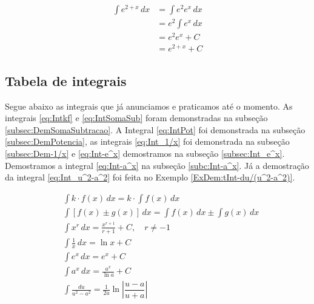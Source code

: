 \cleardoublepage\documentclass[../main.tex]{subfiles}
\begin{document}
\begin{ex}
  \begin{align*}
    \int e^{2 + x}\,dx &= \int e^2e^x\,dx \\
                       &= e^2\int e^x\,dx \\
                       &= e^2e^x + C \\
                       &= e^{2+x} + C
  \end{align*}
\end{ex}

\subsection*{Tabela de integrais}
Segue abaixo as integrais que já anunciamos e praticamos até o momento. As integrais \eqref{eq:Intkf}  e \eqref{eq:IntSomaSub} foram demonstradas na subseção \ref{subsec:DemSomaSubtracao}. A Integral \ref{eq:IntPot}  foi demonstrada na subseção \ref{subsec:DemPotencia}, as integrais \eqref{eq:Int_1/x} foi demonstrada na subseção \ref{subsec:Dem-1/x} e \eqref{eq:Int-e^x} demostramos na subseção \ref{subsec:Int_e^x}. Demostramos a integral \eqref{eq:Int-a^x}  na subseção \ref{subc:Int-a^x}. Já a demostração da integral \eqref{eq:Int_u^2-a^2} foi feita no Exemplo \ref{ExDem:tInt-du/(u^2-a^2)}. 

\begin{align}
 \label{eq:Intkf}
 & \int k\cdot f(x)\,dx = k\cdot\int f(x)\,dx\\\label{eq:IntSomaSub}
  & \int \left[f(x)\pm g(x)\right]\,dx = \int f(x)\,dx \pm \int g(x)\,dx\\\label{eq:IntPot}
  & \int x^r\,dx = \frac{x^{r+1}}{r+1} + C,\quad r\neq -1\\\label{eq:Int_1/x}
  & \int \frac{1}{x}\,dx = \ln x + C \\\label{eq:Int-e^x}
  & \int e^x\,dx = e^x + C\\\label{eq:Int-a^x}
  & \int a^x\,dx = \frac{a^x}{\ln a} + C\\\label{eq:Int_u^2-a^2}
  & \int \frac{du}{u^2-a^2} = \frac{1}{2a}\ln \left|\dfrac{u-a}{u+a}\right|
   \end{align}
\end{document}
